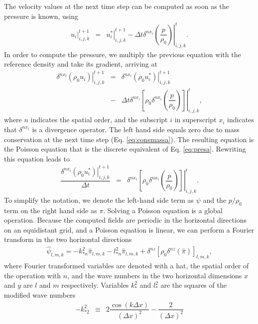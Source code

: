 \documentclass[gmd,manuscript]{copernicus}
\begin{document}
The velocity values at the next time step can be computed as soon as the pressure is known, using
\begin{eqnarray}
\left. u_i\right|^{t+1}_{i,j,k} & = & \left. u_i^* \right|^{t+1}_{i,j,k} - \Delta t \left. \delta^{nx_i}\left( \dfrac{p}{\rho_0}\right)\right|^t_{i,j,k}.
\end{eqnarray}
In order to compute the pressure, we multiply the previous equation with the reference density and take its gradient, arriving at
\begin{eqnarray}
\nonumber \left. \delta^{nx_i} \left( \rho_0 u_i\right) \right|^{t+1}_{i,j,k} & = & 
\left. \delta^{nx_i} \left( \rho_0 u_i^* \right) \right|^{t+1}_{i,j,k}\\
& - &  \Delta t \left.\delta^{nx_i} \left[ \rho_0 \delta^{nx_i}\left( \dfrac{p}{\rho_0}\right) \right] \right|^t_{i,j,k},
\end{eqnarray}
where $n$ indicates the spatial order, and the subscript $i$ in superscript $x_i$ indicates that $\delta^{nx_i}$ is a divergence operator. The left hand side equals zero due to mass conservation at the next time step (Eq. \ref{eq:consmassa}). The resulting equation is the Poisson equation that is the discrete equivalent of Eq. \ref{eq:presa}. Rewriting this equation leads to
\begin{eqnarray}
\dfrac{\left. \delta^{nx_i} \left( \rho_0 u_i^* \right) \right|^{t+1}_{i,j,k}}{\Delta t}
& = &  \left. \delta^{nx_i} \left[ \rho_0 \delta^{nx_i}\left( \dfrac{p}{\rho_0}\right) \right] \right|^t_{i,j,k}.
\end{eqnarray}
To simplify the notation, we denote the left-hand side term as $\psi$ and the $p / \rho_0$ term on the right hand side as $\pi$. Solving a Poisson equation is a global operation. Because the computed fields are periodic in the horizontal directions on an equidistant grid, and a Poisson equation is linear, we can perform a Fourier transform in the two horizontal directions
\begin{eqnarray}
\widehat{\psi}_{l,m,k} = - k^2_{*n} \widehat{\pi}_{l,m,k} - l^2_{*n} \widehat{\pi}_{l,m,k}
+ \delta^{nz} \left[ \rho_0 \delta^{nz} \left( \widehat{\pi} \right) \right]_{l,m,k},\label{eq:presfourier}
\end{eqnarray}
where Fourier transformed variables are denoted with a hat, the spatial order of the operation with $n$, and the wave numbers in the two horizontal dimensions $x$ and $y$ are $l$ and $m$ respectively. Variables $k_*^2$ and $l_*^2$ are the squares of the modified wave numbers
\begin{eqnarray}
-k_{*2}^2 & \equiv & 2 \dfrac{\cos (k \Delta x)}{\left( \Delta x \right)^2} - \dfrac{2}{\left( \Delta x \right)^2}
\end{eqnarray}
\end{document}
